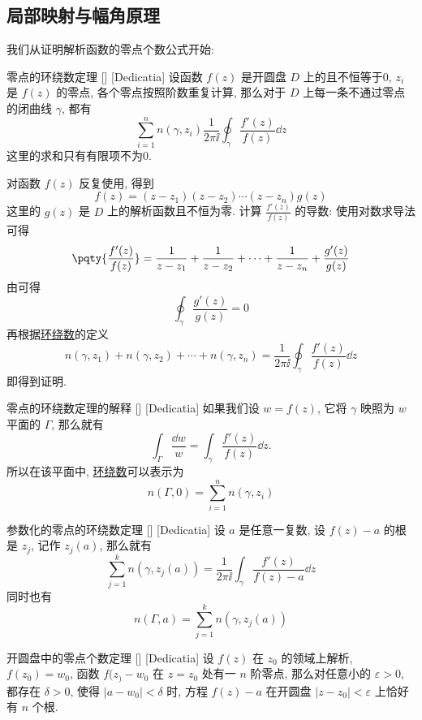 \documentclass[UTF8]{ctexart}
\begin{document}
    \subsection{局部映射与幅角原理}
    我们从证明解析函数的零点个数公式开始: 
    \begin{thm}
        [UUID]
        {零点的环绕数定理}
        []
        [Dedicatia]
        设函数 \(f(z)\) 是开圆盘 \(D\) 上的 且不恒等于0,  \(z_i\) 是 \(f(z)\) 的零点, 各个零点按照阶数重复计算, 那么对于 \(D\) 上每一条不通过零点的闭曲线 \(\gamma\), 都有
        \[\sum_{i=1}^n n(\gamma, z_i)\frac{1}{2\pi\ii}\oint_\gamma\frac{f'(z)}{f(z)}\dd{z} \] 
        这里的求和只有有限项不为0.
    \end{thm}
    \begin{prf}
        对函数 \(f(z)\) 反复使用, 得到
        \[f(z)=(z-z_1)(z-z_2)\cdots(z-z_n)g(z)\]
        这里的 \(g(z)\) 是 \(D\) 上的解析函数且不恒为零. 计算 \(\frac{f'(z)}{f(z)}\) 的导数: 使用对数求导法可得
        \[\pqty{\frac{f'(z)}{f(z)}}=\frac{1}{z-z_1}+\frac{1}{z-z_2}+\cdots+\frac{1}{z-z_n}+\frac{g'(z)}{g(z)}\]
        由\CauchyThm 可得
        \[\oint_\gamma\frac{g'(z)}{g(z)}=0 \]
        再根据\hyperref[dfn:WindingNumber]{环绕数}的定义
        \[n(\gamma,z_1)+n(\gamma,z_2)+\cdots+n(\gamma,z_n)=\frac{1}{2\pi\ii}\oint_\gamma \frac{f'(z)}{f(z)}\dd{z}\]
        即得到证明. 
    \end{prf}
    \begin{crl}
        [UUID]
        {零点的环绕数定理的解释}
        []
        [Dedicatia]
        如果我们设 \(w=f(z)\), 它将 \(\gamma\) 映照为 \(w\) 平面的 \(\Gamma\), 那么就有
        \[\int_\Gamma\frac{\dd w}{w}=\int_\gamma \frac{f'(z)}{f(z)}\dd{z}.\]
        所以在该平面中, \hyperref[dfn:WindingNumber]{环绕数}可以表示为
        \[n(\Gamma,0)=\sum_{i=1}^n n(\gamma,z_i)\]
    \end{crl}
    \begin{crl}
        [UUID]
        {参数化的零点的环绕数定理}
        []
        [Dedicatia]
        设 \(a\) 是任意一复数, 设 \(f(z)-a\) 的根是 \(z_j\), 记作 \(z_j(a)\), 那么就有
        \[\sum_{j=1}^{k}n(\gamma,z_j(a))=\frac{1}{2\pi\ii}\int_\gamma\frac{f'(z)}{f(z)-a}\dd{z}\]
        同时也有
        \[n(\Gamma,a)=\sum_{j=1}^k n(\gamma,z_j(a))\]
    \end{crl}
    \begin{thm}
        [UUID]
        {开圆盘中的零点个数定理}
        []
        [Dedicatia]
        设 \(f(z)\) 在 \(z_0\) 的领域上解析,  \(f(z_0)=w_0\), 函数 \(f(z_)-w_0\) 在 \(z=z_0\) 处有一 \(n\) 阶零点, 那么对任意小的 \(\varepsilon>0\), 都存在 \(\delta>0\), 使得 \(|a-w_0|<\delta\) 时, 方程 \(f(z)-a\) 在开圆盘 \(|z-z_0|<\varepsilon\) 上恰好有 \(n\) 个根. 
    \end{thm}
\end{document}
